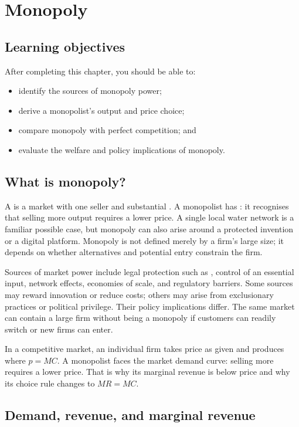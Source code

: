 \chapter{Monopoly}
\label{chap:monopoly}

\section{Learning objectives}

After completing this chapter, you should be able to:
\begin{itemize}
  \item identify the sources of monopoly power;
  \item derive a monopolist's output and price choice;
  \item compare monopoly with perfect competition; and
  \item evaluate the welfare and policy implications of monopoly.
\end{itemize}

\section{What is monopoly?}

A  is a market with one seller and substantial
. A monopolist has : it
recognises that selling more output requires a lower price. A single local
water network is a familiar possible case, but monopoly can also arise around
a protected invention or a digital platform. Monopoly is not defined merely by
a firm's large size; it depends on whether alternatives and potential entry
constrain the firm.

Sources of market power include legal protection such as ,
control of an essential input, network effects, economies of scale, and
regulatory barriers. Some sources may reward innovation or reduce costs; others
may arise from exclusionary practices or political privilege. Their policy
implications differ. The same market can contain a large firm without being a
monopoly if customers can readily switch or new firms can enter.

In a competitive market, an individual firm takes price as given and produces
where $p=MC$. A monopolist faces the market demand curve: selling more requires
a lower price. That is why its marginal revenue is below price and why its
choice rule changes to $MR=MC$.

\section{Demand, revenue, and marginal revenue}

